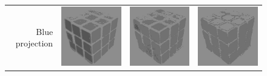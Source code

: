 \begin{figure}
\begin{tabular}{rccc}
         Blue projection &
         \includegraphics[width=\rubiklength]{img/rubik/1_yuv_u.jpg} & 
         \includegraphics[width=\rubiklength]{img/rubik/2_yuv_u.jpg} &
         \includegraphics[width=\rubiklength]{img/rubik/3_yuv_u.jpg}\\
         

\end{tabular}
\end{figure}
